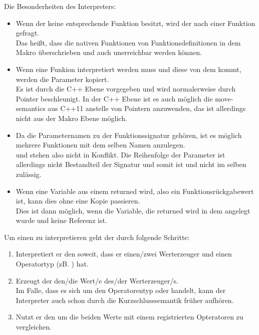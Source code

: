       Die Besonderheiten des Interpreters:
      \begin{itemize}
        \item Wenn der  keine entsprechende Funktion besitzt, wird der  nach einer Funktion gefragt.\\
          Das heißt, dass die nativen Funktionen von Funktionsdefinitionen in dem Makro überschrieben und auch unerreichbar werden können.
        \item Wenn eine Funkion interpretiert werden muss und diese von dem  kommt, werden die Parameter kopiert.\\
          Es ist durch die C++ Ebene vorgegeben und wird normalerweise durch Pointer beschleunigt. In der C++ Ebene ist es auch möglich die move-semantics aus C++11 anstelle von Pointern anzuwenden, das ist allerdings nicht aus der Makro Ebene möglich.
        \item Da die Parameternamen zu der Funktionssignatur gehören, ist es möglich mehrere Funktionen mit dem selben Namen anzulegen.\\ %
           und  stehen also nicht in Konflikt. Die Reihenfolge der Parameter ist allerdings nicht Bestandteil der Signatur und somit ist  und  nicht im selben  zulässig.
        \item Wenn eine Variable aus einem  returned wird, also ein Funktionsrückgabewert ist, kann dies ohne eine Kopie passieren.\\
          Dies ist dann möglich, wenn die Variable, die returned wird in dem  angelegt wurde und keine Referenz ist.
      \end{itemize}

      Um einen  zu interpretieren geht der  durch folgende Schritte:
      \begin{enumerate}
        \item Interpretiert er den   soweit, dass er einen/zwei Werterzeuger und einen Operatortyp (zB. \myMinin{==}) hat.
        \item Erzeugt der  den/die Wert/e des/der Werterzeuger/s.\\
          Im Falle, dass es sich um den Operatorentyp \myMinin{&&} oder \myMinin{||} handelt, kann der Interpreter auch schon durch die Kurzschlusssemantik früher aufhören.
        \item Nutzt er den  um die beiden Werte mit einem registrierten Opteratoren zu vergleichen.
      \end{enumerate}

